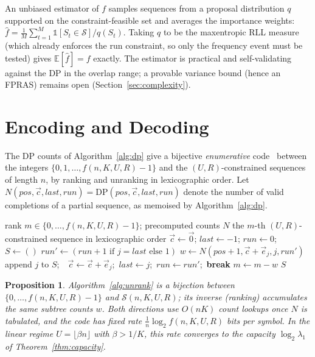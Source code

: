 \documentclass[a4paper,12pt]{article}
\newtheorem{proposition}{Proposition}
\begin{document}
An unbiased estimator of $f$ samples sequences from a proposal
distribution $q$ supported on the constraint-feasible set and averages
the importance weights:
$\widehat f=\frac1M\sum_{t=1}^M \mathbb{1}[S_t\in\mathcal S]/q(S_t)$.
Taking $q$ to be the maxentropic RLL measure (which already enforces
the run constraint, so only the frequency event must be tested) gives
$\mathbb{E}[\widehat f]=f$ exactly.  The estimator is practical and
self-validating against the DP in the overlap range; a provable
variance bound (hence an FPRAS) remains open
(Section~\ref{sec:complexity}).

\section{Encoding and Decoding}
\label{sec:coding}

The DP counts of Algorithm~\ref{alg:dp} give a bijective
\emph{enumerative} code~\cite{cover2006} between the integers
$\{0,1,\ldots,f(n,K,U,R)-1\}$ and the $(U,R)$-constrained sequences of
length $n$, by ranking and unranking in lexicographic order.  Let
$N(pos,\vec c,last,run)=\mathrm{DP}(pos,\vec c,last,run)$ denote the
number of valid completions of a partial sequence, as memoised by
Algorithm~\ref{alg:dp}.

\begin{algorithm}[H]
\caption{Unranking: integer $\mapsto$ constrained sequence}
\label{alg:unrank}
\begin{algorithmic}[1]
\Require rank $m\in\{0,\ldots,f(n,K,U,R)-1\}$; precomputed counts $N$
\Ensure the $m$-th $(U,R)$-constrained sequence in lexicographic order
\State $\vec c\gets\vec0$; $last\gets-1$; $run\gets0$; $S\gets()$
            \State $run'\gets(run{+}1\text{ if }j{=}last\text{ else }1)$
            \State $w\gets N(pos{+}1,\vec c{+}\vec e_j,j,run')$
                \State append $j$ to $S$;\ \ $\vec c\gets\vec c{+}\vec e_j$;\ $last\gets j$;\ $run\gets run'$;\ \textbf{break}
            \Else
                \State $m\gets m-w$
            \EndIf
        \EndIf
    \EndFor
\EndFor
\State \Return $S$
\end{algorithmic}
\end{algorithm}

\begin{proposition}\label{prop:coding}
Algorithm~\ref{alg:unrank} is a bijection between
$\{0,\ldots,f(n,K,U,R)-1\}$ and $\mathcal S(n,K,U,R)$; its inverse
(ranking) accumulates the same subtree counts $w$.  Both directions use
$O(nK)$ count lookups once $N$ is tabulated, and the code has fixed
rate $\tfrac1n\log_2 f(n,K,U,R)$ bits per symbol.  In the linear regime
$U=\lfloor\beta n\rfloor$ with $\beta>1/K$, this rate converges to the
capacity $\log_2\lambda_1$ of Theorem~\ref{thm:capacity}.
\end{proposition}
\end{document}
